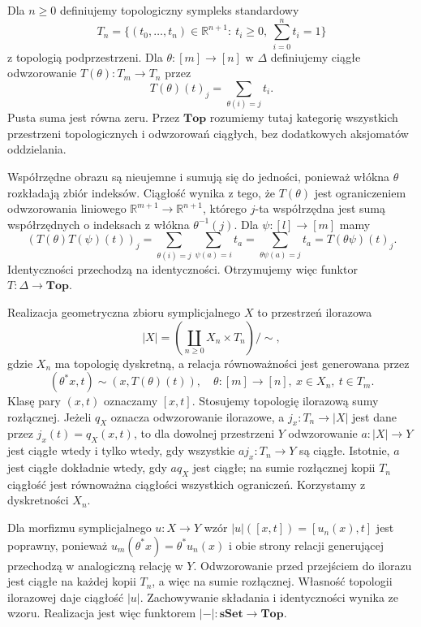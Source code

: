 \begin{definicja}\label{cat:def:topological-simplex}
Dla $n\geq0$ definiujemy topologiczny sympleks standardowy
\[
 T_n=\{(t_0,\ldots,t_n)\in\mathbb R^{n+1}:\
             t_i\geq0,\ \textstyle\sum_{i=0}^n t_i=1\}
\]
z topologią podprzestrzeni. Dla $\theta:[m]\to[n]$ w $\Delta$ definiujemy ciągłe odwzorowanie $T(\theta):T_m\to T_n$ przez
\[
 T(\theta)(t)_j=\sum_{\theta(i)=j}t_i.
\]
Pusta suma jest równa zeru. Przez $\mathbf{Top}$ rozumiemy tutaj kategorię wszystkich przestrzeni topologicznych i odwzorowań ciągłych, bez dodatkowych aksjomatów oddzielania.
\end{definicja}
Współrzędne obrazu są nieujemne i sumują się do jedności, ponieważ włókna $\theta$ rozkładają zbiór indeksów. Ciągłość wynika z tego, że $T(\theta)$ jest ograniczeniem odwzorowania liniowego $\mathbb R^{m+1}\to\mathbb R^{n+1}$, którego $j$-ta współrzędna jest sumą współrzędnych o indeksach z włókna $\theta^{-1}(j)$. Dla $\psi:[l]\to[m]$ mamy
\[
 (T(\theta)T(\psi)(t))_j
 =\sum_{\theta(i)=j}\sum_{\psi(a)=i}t_a
 =\sum_{\theta\psi(a)=j}t_a
 =T(\theta\psi)(t)_j.
\]
Identyczności przechodzą na identyczności. Otrzymujemy więc funktor $T:\Delta\to\mathbf{Top}$.

\begin{definicja}\label{cat:def:geometric-realization}
Realizacja geometryczna zbioru symplicjalnego $X$ to przestrzeń ilorazowa
\[
 |X|=\left(\coprod_{n\geq0}X_n\times T_n\right)/{\sim},
\]
gdzie $X_n$ ma topologię dyskretną, a relacja równoważności jest generowana przez
\begin{equation}\label{cat:eq:realization-relation}
 (\theta^*x,t)\sim (x,T(\theta)(t)),
 \quad \theta:[m]\to[n],\ x\in X_n,\ t\in T_m.
\end{equation}
Klasę pary $(x,t)$ oznaczamy $[x,t]$. Stosujemy topologię ilorazową sumy rozłącznej. Jeżeli $q_X$ oznacza odwzorowanie ilorazowe, a $j_x:T_n\to |X|$ jest dane przez $j_x(t)=q_X(x,t)$, to dla dowolnej przestrzeni $Y$ odwzorowanie $a:|X|\to Y$ jest ciągłe wtedy i tylko wtedy, gdy wszystkie $a j_x:T_n\to Y$ są ciągłe. Istotnie, $a$ jest ciągłe dokładnie wtedy, gdy $a q_X$ jest ciągłe; na sumie rozłącznej kopii $T_n$ ciągłość jest równoważna ciągłości wszystkich ograniczeń. Korzystamy z dyskretności $X_n$.
\end{definicja}
Dla morfizmu symplicjalnego $u:X\to Y$ wzór $|u|([x,t])=[u_n(x),t]$ jest poprawny, ponieważ $u_m(\theta^*x)=\theta^*u_n(x)$ i obie strony relacji generującej przechodzą w analogiczną relację w $Y$. Odwzorowanie przed przejściem do ilorazu jest ciągłe na każdej kopii $T_n$, a więc na sumie rozłącznej. Własność topologii ilorazowej daje ciągłość $|u|$. Zachowywanie składania i identyczności wynika ze wzoru. Realizacja jest więc funktorem $|-|:\mathbf{sSet}\to\mathbf{Top}$.

